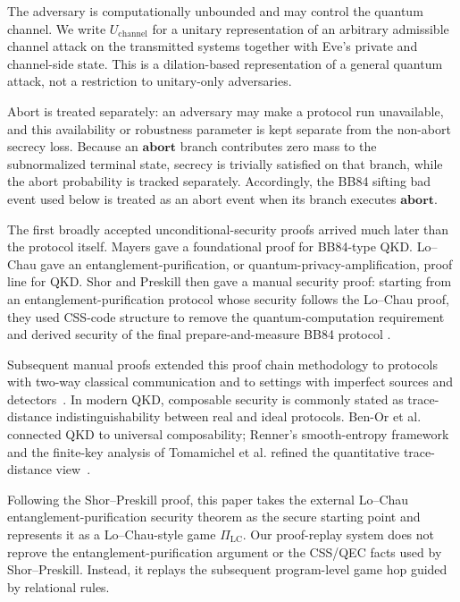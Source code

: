 \documentclass[conference,compsoc]{IEEEtran}
\newcommand{\bb}{\textsf{BB84}\xspace}
\begin{document}
The adversary is computationally unbounded and may control the quantum channel. We write \(U_{\mathrm{channel}}\) for a unitary representation of an arbitrary admissible channel attack on the transmitted systems together with Eve's private and channel-side state. This is a dilation-based representation of a general quantum attack, not a restriction to unitary-only adversaries.


Abort is treated separately: an adversary may make a protocol run unavailable, and this availability or robustness parameter is kept separate from the non-abort secrecy loss. Because an \(\mathbf{abort}\) branch contributes zero mass to the subnormalized terminal state, secrecy is trivially satisfied on that branch, while the abort probability is tracked separately. Accordingly, the \bb sifting bad event used below is treated as an abort event when its branch executes \(\mathbf{abort}\).

The first broadly accepted unconditional-security proofs arrived much later than the protocol itself. Mayers gave a foundational proof for \bb-type QKD. Lo--Chau gave an entanglement-purification, or quantum-privacy-amplification, proof line for QKD. Shor and Preskill then gave a manual security proof: starting from an entanglement-purification protocol whose security follows the Lo--Chau proof, they used CSS-code structure to remove the quantum-computation requirement and derived security of the final prepare-and-measure \bb protocol
\cite{bb84,lochau1999unconditional,shor2000simple,mayers2001unconditional}.

Subsequent manual proofs extended this proof chain methodology to protocols with two-way classical communication and to settings with imperfect sources and detectors~\cite{gottesman2003twoway,gllp2004imperfect}. In modern QKD, composable security is commonly stated as trace-distance indistinguishability between real and ideal protocols. Ben-Or et al. connected QKD to universal composability; Renner's smooth-entropy framework and the finite-key analysis of Tomamichel et al. refined the quantitative trace-distance view~\cite{benor2005ucqkd,renner2005security,renner2008security,tomamichel2012tight,portmann2022security}. 

Following the Shor--Preskill proof, this paper takes the external Lo--Chau
entanglement-purification security theorem as the secure starting point and
represents it as a Lo--Chau-style game \(\Pi_{\mathrm{LC}}\). Our proof-replay
system does not reprove the entanglement-purification argument or the CSS/QEC
facts used by Shor--Preskill. Instead, it replays the subsequent program-level game hop guided by relational rules. 
\end{document}
